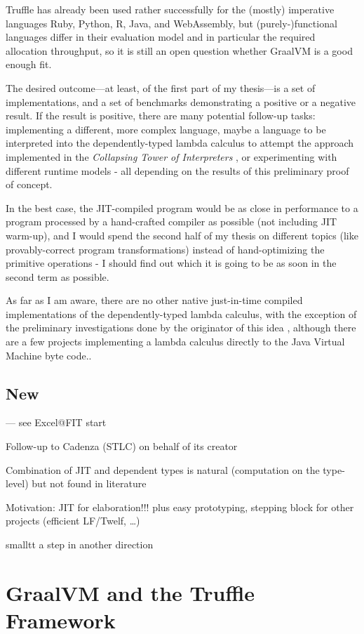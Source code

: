 \documentclass[english,zadani,odsaz]{fitthesis}
\begin{document}
Truffle has already been used rather successfully for the (mostly) imperative
languages Ruby, Python, R, Java, and WebAssembly, but (purely-)functional
languages differ in their evaluation model and in particular the required
allocation throughput, so it is still an open question whether GraalVM is a good
enough fit.

The desired outcome---at least, of the first part of my thesis---is a set of
implementations, and a set of benchmarks demonstrating a positive or a negative
result.  If the result is positive, there are many potential follow-up tasks:
implementing a different, more complex language, maybe a language to be
interpreted into the dependently-typed lambda calculus to attempt the approach
implemented in the \emph{Collapsing Tower of Interpreters} \cite{amin2017collapsing},
or experimenting with different runtime models - all depending on the results of
this preliminary proof of concept.

In the best case, the JIT-compiled program would be as close in performance to a
program processed by a hand-crafted compiler as possible (not including JIT
warm-up), and I would spend the second half of my thesis on different topics
(like provably-correct program transformations) instead of hand-optimizing the
primitive operations - I should find out which it is going to be as soon in the
second term as possible.

As far as I am aware, there are no other native just-in-time compiled
implementations of the dependently-typed lambda calculus, with the exception of
the preliminary investigations done by the originator of this idea
\cite{kmett_2019}, although there are a few projects implementing a lambda
calculus directly to the Java Virtual Machine byte code..

\section{New}
\label{sec:org87d7d5a}
--- see Excel@FIT start

Follow-up to Cadenza (STLC) on behalf of its creator

Combination of JIT and dependent types is natural (computation on the type-level) but not found in literature

Motivation: JIT for elaboration!!! plus easy prototyping, stepping block for
    other projects (efficient LF/Twelf, \ldots{})

smalltt a step in another direction


\chapter{GraalVM and the Truffle Framework}
\label{sec:org55e978c}
\end{document}
